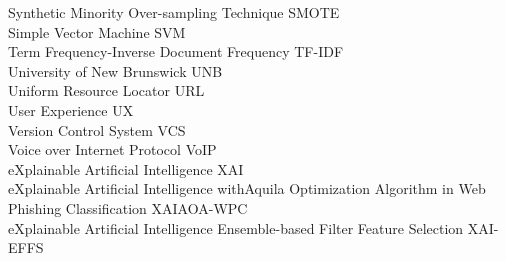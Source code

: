 Synthetic Minority Over-sampling Technique \hfill SMOTE\\
Simple Vector Machine \hfill SVM\\
Term Frequency-Inverse Document Frequency \hfill TF-IDF\\
University of New Brunswick \hfill UNB\\
Uniform Resource Locator \hfill URL\\
User Experience \hfill UX\\
Version Control System \hfill VCS\\
Voice over Internet Protocol \hfill VoIP\\
eXplainable Artificial Intelligence \hfill XAI\\
eXplainable Artificial Intelligence with\newline Aquila Optimization Algorithm in Web Phishing Classification \hfill XAIAOA-WPC\\
eXplainable Artificial Intelligence Ensemble-based Filter Feature Selection \hfill XAI-EFFS\\
